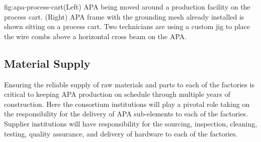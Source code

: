 \begin{dunefigure}{fig:apa-process-cart}{(Left) APA being moved around a production facility on the process cart. (Right) APA frame with the grounding mesh already installed is shown sitting on a process cart.  Two technicians are using a custom jig to place the wire combs above a horizontal cross beam on the APA.}
\setlength{\fboxsep}{0pt}
\setlength{\fboxrule}{0.5pt}
\end{dunefigure}

\subsection{Material Supply}  

Ensuring the reliable supply of raw materials and parts to each of the factories is critical to keeping APA production on schedule through multiple years of construction. Here the consortium institutions will play a pivotal role taking on the responsibility for the delivery of APA sub-elements to each of the factories. Supplier institutions will have responsibility for the sourcing, inspection, cleaning, testing, quality assurance, and delivery of hardware to each of the factories. 

